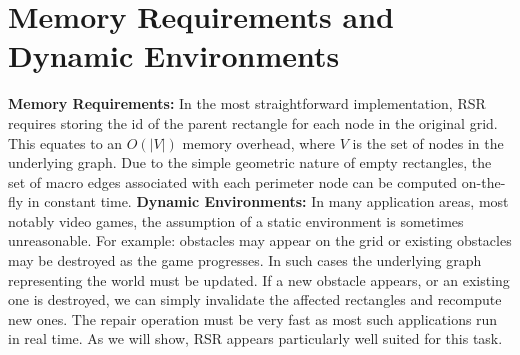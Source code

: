 \section{Memory Requirements and Dynamic Environments}
\label{sec:memory}
\textbf{Memory Requirements: }
In the most straightforward implementation, RSR requires storing the id of the
parent rectangle for each node in the original grid. 
This equates to an $O(|V|)$ memory overhead, where $V$ is the set of nodes
in the underlying graph.
Due to the simple geometric nature of empty rectangles, the set of macro
edges associated with each perimeter node can be computed on-the-fly in
constant time. 
\newline \noindent
\textbf{Dynamic Environments: }
In many application areas, most notably video games, the assumption of a static 
environment is sometimes unreasonable.
For example: obstacles may appear on the grid or existing obstacles may be
destroyed as the game progresses.
In such cases the underlying graph representing the world must be updated.
If a new obstacle appears, or an existing one is destroyed,
we can simply invalidate the affected rectangles and recompute new ones.
The repair operation must be very fast as most such applications run in real
time. As we will show, RSR appears particularly well suited for this task.
